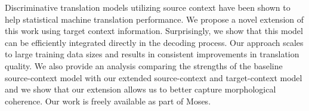 Discriminative translation models utilizing source context have been shown to help statistical machine translation performance. We propose a novel extension of this work using target context information. Surprisingly, we show that this model can be efficiently integrated directly in the decoding process. Our approach scales to large training data sizes and results in consistent improvements in translation quality. We also provide an analysis comparing the strengths of the baseline source-context model with our extended source-context and target-context model and we show that our extension allows us to better capture morphological coherence. Our work is freely available as part of Moses.
